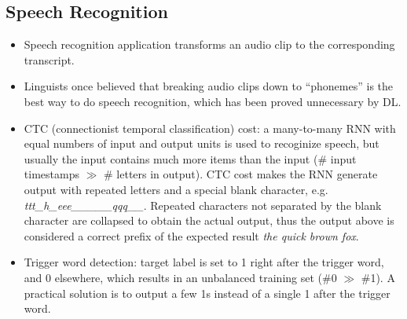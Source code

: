 \subsection{Speech Recognition}
\begin{itemize}
  \item Speech recognition application transforms an audio clip to the corresponding transcript.
  \item Linguists once believed that breaking audio clips down to ``phonemes'' is the best way to do speech recognition, which has been proved unnecessary by DL.
  \item CTC (connectionist temporal classification) cost: a many-to-many RNN with equal numbers of input and output units is used to recoginize speech, but usually the input contains much more items than the input (\# input timestamps $\gg$ \# letters in output). CTC cost makes the RNN generate output with repeated letters and a special blank character, e.g. \textit{ttt\_h\_eee\_\_\textvisiblespace\_\_\_qqq\_\_}. Repeated characters not separated by the blank character are collapsed to obtain the actual output, thus the output above is considered a correct prefix of the expected result \textit{the quick brown fox}.
  \item Trigger word detection: target label is set to 1 right after the trigger word, and 0 elsewhere, which results in an unbalanced training set (\#0 $\gg$ \#1). A practical solution is to output a few 1s instead of a single 1 after the trigger word.
\end{itemize}

\ifx\PREAMBLE\undefined

\fi